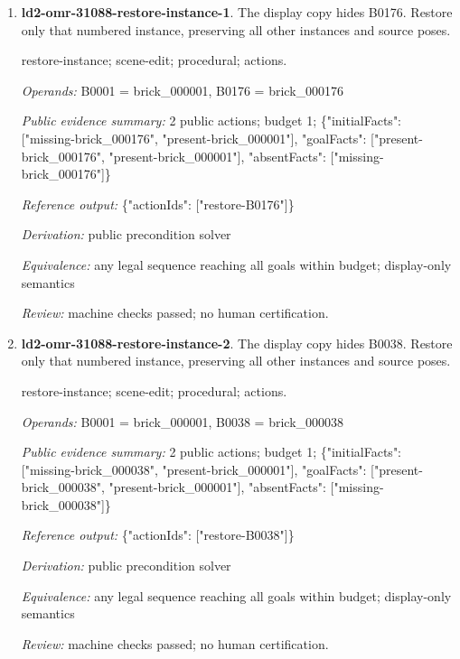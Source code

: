 \begin{enumerate}
\par{\small source-sequence; scene-edit; procedural; actions.\par\textit{Operands:} B0001 = brick\_000001, B0009 = brick\_000009, B0006 = brick\_000006, B0008 = brick\_000008, B0005 = brick\_000005, B0004 = brick\_000004, B0002 = brick\_000002, B0003 = brick\_000003, B0007 = brick\_000007\par\textit{Public evidence summary:} 6 public actions; budget 6; \{"initialFacts": ["start"], "goalFacts": ["done-6"], "absentFacts": []\}\par\textit{Reference output:} \{"actionIds": ["step-1", "step-2", "step-3", "step-4", "step-5", "step-6"]\}\par\textit{Derivation:} public precondition solver\par\textit{Equivalence:} any legal sequence reaching all goals within budget; display-only semantics\par\textit{Review:} machine checks passed; no human certification.}
\item \textbf{ld2-omr-31088-restore-instance-1}. The display copy hides B0176. Restore only that numbered instance, preserving all other instances and source poses.
\par{\small restore-instance; scene-edit; procedural; actions.\par\textit{Operands:} B0001 = brick\_000001, B0176 = brick\_000176\par\textit{Public evidence summary:} 2 public actions; budget 1; \{"initialFacts": ["missing-brick\_000176", "present-brick\_000001"], "goalFacts": ["present-brick\_000176", "present-brick\_000001"], "absentFacts": ["missing-brick\_000176"]\}\par\textit{Reference output:} \{"actionIds": ["restore-B0176"]\}\par\textit{Derivation:} public precondition solver\par\textit{Equivalence:} any legal sequence reaching all goals within budget; display-only semantics\par\textit{Review:} machine checks passed; no human certification.}
\item \textbf{ld2-omr-31088-restore-instance-2}. The display copy hides B0038. Restore only that numbered instance, preserving all other instances and source poses.
\par{\small restore-instance; scene-edit; procedural; actions.\par\textit{Operands:} B0001 = brick\_000001, B0038 = brick\_000038\par\textit{Public evidence summary:} 2 public actions; budget 1; \{"initialFacts": ["missing-brick\_000038", "present-brick\_000001"], "goalFacts": ["present-brick\_000038", "present-brick\_000001"], "absentFacts": ["missing-brick\_000038"]\}\par\textit{Reference output:} \{"actionIds": ["restore-B0038"]\}\par\textit{Derivation:} public precondition solver\par\textit{Equivalence:} any legal sequence reaching all goals within budget; display-only semantics\par\textit{Review:} machine checks passed; no human certification.}
\end{enumerate}

